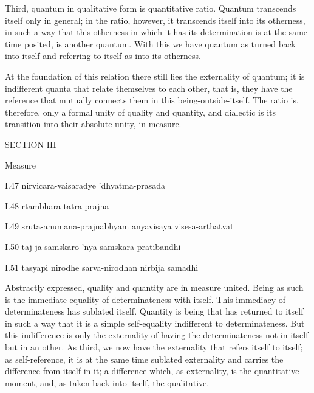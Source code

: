 Third, quantum in qualitative form is quantitative ratio.
Quantum transcends itself only in general;
in the ratio, however, it transcends itself into its otherness,
in such a way that this otherness in which it has its determination
is at the same time posited, is another quantum.
With this we have quantum as turned back into itself
and referring to itself as into its otherness.

At the foundation of this relation there still
lies the externality of quantum;
it is indifferent quanta that
relate themselves to each other,
that is, they have the reference
that mutually connects them
in this being-outside-itself.
The ratio is, therefore, only
a formal unity of quality and quantity,
and dialectic is its transition into
their absolute unity, in measure.

SECTION III

Measure

I.47
nirvicara-vaisaradye 'dhyatma-prasada

I.48
rtambhara tatra prajna

I.49
sruta-anumana-prajnabhyam anyavisaya visesa-arthatvat

I.50
taj-ja samskaro 'nya-samskara-pratibandhi

I.51
tasyapi nirodhe sarva-nirodhan nirbija samadhi

Abstractly expressed, quality and quantity are in measure united.
Being as such is the immediate equality of determinateness with itself.
This immediacy of determinateness has sublated itself.
Quantity is being that has returned to itself in such a way
that it is a simple self-equality indifferent to determinateness.
But this indifference is only the externality of having
the determinateness not in itself but in an other.
As third, we now have the externality that refers itself to itself;
as self-reference, it is at the same time sublated externality and
carries the difference from itself in it;
a difference which, as externality, is the quantitative moment,
and, as taken back into itself, the qualitative.

